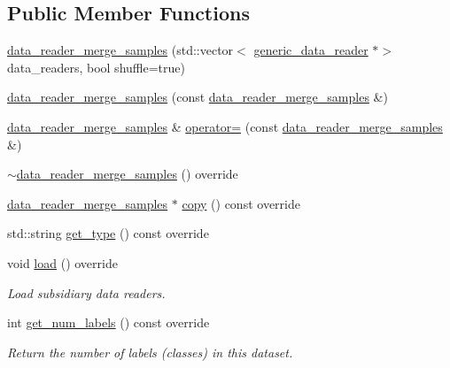 \subsection*{Public Member Functions}
\begin{DoxyCompactItemize}
\item 
\hyperlink{classlbann_1_1data__reader__merge__samples_a01ff9ff7827030da41f1f6d257551260}{data\+\_\+reader\+\_\+merge\+\_\+samples} (std\+::vector$<$ \hyperlink{classlbann_1_1generic__data__reader}{generic\+\_\+data\+\_\+reader} $\ast$$>$ data\+\_\+readers, bool shuffle=true)
\item 
\hyperlink{classlbann_1_1data__reader__merge__samples_aaf15afcafbcd02c21763ae6cfc6ffe01}{data\+\_\+reader\+\_\+merge\+\_\+samples} (const \hyperlink{classlbann_1_1data__reader__merge__samples}{data\+\_\+reader\+\_\+merge\+\_\+samples} \&)
\item 
\hyperlink{classlbann_1_1data__reader__merge__samples}{data\+\_\+reader\+\_\+merge\+\_\+samples} \& \hyperlink{classlbann_1_1data__reader__merge__samples_a781fcc341e120886a3359e8ab41121d7}{operator=} (const \hyperlink{classlbann_1_1data__reader__merge__samples}{data\+\_\+reader\+\_\+merge\+\_\+samples} \&)
\item 
\hyperlink{classlbann_1_1data__reader__merge__samples_a42d90dd08c4e7bd6d83fde2d7b4578c3}{$\sim$data\+\_\+reader\+\_\+merge\+\_\+samples} () override
\item 
\hyperlink{classlbann_1_1data__reader__merge__samples}{data\+\_\+reader\+\_\+merge\+\_\+samples} $\ast$ \hyperlink{classlbann_1_1data__reader__merge__samples_ae22e720cfc9c6a196a04b7b65472618e}{copy} () const override
\item 
std\+::string \hyperlink{classlbann_1_1data__reader__merge__samples_a5d24385daebfd31343e6afc11b0439d1}{get\+\_\+type} () const override
\item 
void \hyperlink{classlbann_1_1data__reader__merge__samples_ab3554341417f5eba95b9c1098af40410}{load} () override
\begin{DoxyCompactList}\small\item\em Load subsidiary data readers. \end{DoxyCompactList}\item 
int \hyperlink{classlbann_1_1data__reader__merge__samples_a98cb18c29a24358c9a385e29f57c3d57}{get\+\_\+num\+\_\+labels} () const override
\begin{DoxyCompactList}\small\item\em Return the number of labels (classes) in this dataset. \end{DoxyCompactList}\item 
$$
\end{DoxyCompactItemize}
